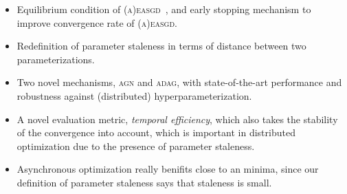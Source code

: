 \begin{itemize}
\item Equilibrium condition of \textsc{(a)easgd}~\cite{zhang2015deep}, and early stopping mechanism to improve convergence rate of \textsc{(a)easgd}.
\item Redefinition of parameter staleness in terms of distance between two parameterizations.
\item Two novel mechanisms, \textsc{agn} and \textsc{adag}, with state-of-the-art performance and robustness against (distributed) hyperparameterization.
\item A novel evaluation metric, \emph{temporal efficiency}, which also takes the stability of the convergence into account, which is important in distributed optimization due to the presence of parameter staleness.
\item Asynchronous optimization really benifits close to an minima, since our definition of parameter staleness says that staleness is small.
\end{itemize}

